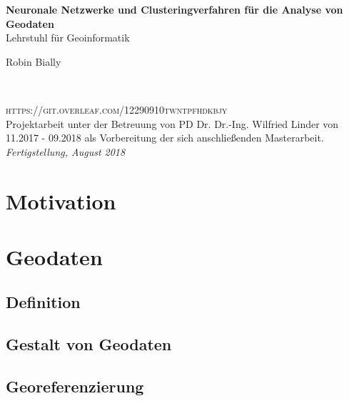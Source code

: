 \documentclass[11pt,fleqn]{book} %
\begin{document}


\begingroup
\thispagestyle{empty}
\centering
\vspace*{5cm}
\par\normalfont\fontsize{35}{35}\sffamily\selectfont
\textbf{{\color{white} Neuronale Netzwerke und Clusteringverfahren für die Analyse von Geodaten}}\\
{\LARGE {\color{white}Lehrstuhl für Geoinformatik}}\par
\vspace*{1cm}
{\Huge {\color{white} Robin Bially}}\par %
\endgroup


\newpage
~\vfill
\thispagestyle{empty}

\noindent \textsc{https://git.overleaf.com/12290910twntpfhdkbjy}\\ %

\noindent Projektarbeit unter der Betreuung von PD Dr. Dr.-Ing. Wilfried Linder von 11.2017 - 09.2018 als Vorbereitung der sich anschließenden Masterarbeit.\\ 

\noindent \textit{Fertigstellung, August 2018} 

\tableofcontents %


\pagestyle{fancy} %

\chapter{Motivation}
\chapter{Geodaten}
\section{Definition}
\section{Gestalt von Geodaten}
\section{Georeferenzierung}
\end{document}
